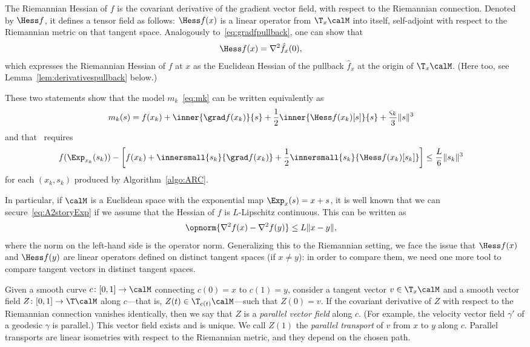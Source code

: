 The Riemannian Hessian of $f$ is the covariant derivative of the gradient vector field, with respect to the Riemannian connection. Denoted by $\Hess f$, it defines a tensor field as follows: $\Hess f(x)$ is a linear operator from $\T_x\calM$ into itself, self-adjoint with respect to the Riemannian metric on that tangent space. Analogously to~\eqref{eq:gradfpullback}, one can show that
\begin{align}
	\Hess f(x) & = \nabla^2 \hat f_x(0),
	\label{eq:HessfHessfhatExp}
\end{align}
which expresses the Riemannian Hessian of $f$ at $x$ as the Euclidean Hessian of the pullback $\hat f_x$ at the origin of $\T_x\calM$. (Here too, see Lemma~\ref{lem:derivativespullback} below.)

These two statements show that the model $m_k$~\eqref{eq:mk} can be written equivalently as
\begin{align}
	m_k(s) & = f(x_k) + \inner{\grad f(x_k)}{s} + \frac{1}{2} \inner{\Hess f(x_k)[s]}{s} + \frac{\varsigma_k}{3} \|s\|^3
	\label{eq:mkExp}
\end{align}
and that~ requires
\begin{align}
	f(\Exp_{x_k}(s_k)) - \left[ f(x_k) + \innersmall{s_k}{\grad f(x_k)} + \frac{1}{2}\innersmall{s_k}{\Hess f(x_k)[s_k]} \right] & \leq \frac{L}{6} \|s_k\|^3
	\label{eq:A2storyExp}
\end{align}
for each $(x_k, s_k)$ produced by Algorithm~\ref{algo:ARC}.

In particular, if $\calM$ is a Euclidean space with the exponential map $\Exp_x(s) = x+s$, it is well known that we can secure~\eqref{eq:A2storyExp} if we assume that the Hessian of $f$ is $L$-Lipschitz continuous. This can be written as
\begin{align*}
	\opnorm{\nabla^2 f(x) - \nabla^2 f(y)} & \leq L \|x-y\|,
\end{align*}
where the norm on the left-hand side is the operator norm.
Generalizing this to the Riemannian setting, we face the issue that $\Hess f(x)$ and $\Hess f(y)$ are linear operators defined on distinct tangent spaces (if $x \neq y$): in order to compare them, we need one more tool to compare tangent vectors in distinct tangent spaces.

Given a smooth curve $c \colon [0, 1] \to \calM$ connecting $c(0) = x$ to $c(1) = y$, consider a tangent vector $v \in \T_x\calM$ and a smooth vector field $Z \colon [0, 1] \to \T\calM$ along $c$---that is, $Z(t) \in \T_{c(t)}\calM$---such that $Z(0) = v$.
If the covariant derivative of $Z$ with respect to the Riemannian connection vanishes identically, then we say that $Z$ is a \emph{parallel vector field} along $c$. (For example, the velocity vector field $\gamma'$ of a geodesic $\gamma$ is parallel.) This vector field exists and is unique. We call $Z(1)$ the \emph{parallel transport} of $v$ from $x$ to $y$ along $c$. Parallel transports are linear isometries with respect to the Riemannian metric, and they depend on the chosen path.

